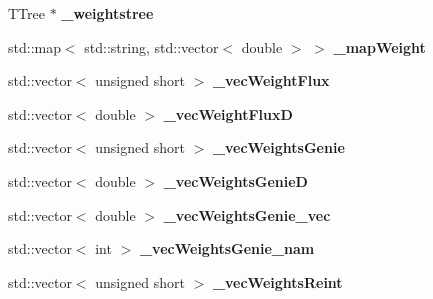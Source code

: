\begin{DoxyCompactItemize}
\item 
T\+Tree $\ast$ {\bfseries \+\_\+weightstree}\hypertarget{classanalysis_1_1EventWeightTree_a007ac1f04819cff64bb54b6206966408}{}\label{classanalysis_1_1EventWeightTree_a007ac1f04819cff64bb54b6206966408}

\item 
std\+::map$<$ std\+::string, std\+::vector$<$ double $>$ $>$ {\bfseries \+\_\+map\+Weight}\hypertarget{classanalysis_1_1EventWeightTree_aef493db93e72288ef19cd155052fbce6}{}\label{classanalysis_1_1EventWeightTree_aef493db93e72288ef19cd155052fbce6}

\item 
std\+::vector$<$ unsigned short $>$ {\bfseries \+\_\+vec\+Weight\+Flux}\hypertarget{classanalysis_1_1EventWeightTree_a910357008946bb4d35372261d9bb7ea1}{}\label{classanalysis_1_1EventWeightTree_a910357008946bb4d35372261d9bb7ea1}

\item 
std\+::vector$<$ double $>$ {\bfseries \+\_\+vec\+Weight\+FluxD}\hypertarget{classanalysis_1_1EventWeightTree_a44cbf85cc0a3008c1e9c0615a5fd7821}{}\label{classanalysis_1_1EventWeightTree_a44cbf85cc0a3008c1e9c0615a5fd7821}

\item 
std\+::vector$<$ unsigned short $>$ {\bfseries \+\_\+vec\+Weights\+Genie}\hypertarget{classanalysis_1_1EventWeightTree_ab837d62e0d9340b085f42b2a1f04fa13}{}\label{classanalysis_1_1EventWeightTree_ab837d62e0d9340b085f42b2a1f04fa13}

\item 
std\+::vector$<$ double $>$ {\bfseries \+\_\+vec\+Weights\+GenieD}\hypertarget{classanalysis_1_1EventWeightTree_afab053ebb6eeae4b674dbbb9c51b5b71}{}\label{classanalysis_1_1EventWeightTree_afab053ebb6eeae4b674dbbb9c51b5b71}

\item 
std\+::vector$<$ double $>$ {\bfseries \+\_\+vec\+Weights\+Genie\+\_\+vec}\hypertarget{classanalysis_1_1EventWeightTree_a8a810f60c08a21ee2f6bfd881cf9f016}{}\label{classanalysis_1_1EventWeightTree_a8a810f60c08a21ee2f6bfd881cf9f016}

\item 
std\+::vector$<$ int $>$ {\bfseries \+\_\+vec\+Weights\+Genie\+\_\+nam}\hypertarget{classanalysis_1_1EventWeightTree_a8d2b9d134034c38e6ee22a3497951694}{}\label{classanalysis_1_1EventWeightTree_a8d2b9d134034c38e6ee22a3497951694}

\item 
std\+::vector$<$ unsigned short $>$ {\bfseries \+\_\+vec\+Weights\+Reint}\hypertarget{classanalysis_1_1EventWeightTree_a5b6e431b670596efe489e47b6463a640}{}\label{classanalysis_1_1EventWeightTree_a5b6e431b670596efe489e47b6463a640}


\end{DoxyCompactItemize}
